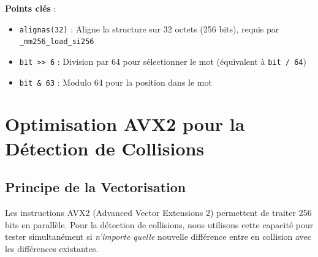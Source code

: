 \documentclass[12pt,a4paper,twoside]{report}
\begin{document}
\textbf{Points clés} :
\begin{itemize}
    \item \texttt{alignas(32)} : Aligne la structure sur 32 octets (256 bits), requis par \texttt{\_mm256\_load\_si256}
    \item \texttt{bit >> 6} : Division par 64 pour sélectionner le mot (équivalent à \texttt{bit / 64})
    \item \texttt{bit \& 63} : Modulo 64 pour la position dans le mot
\end{itemize}

\section{Optimisation AVX2 pour la Détection de Collisions}

\subsection{Principe de la Vectorisation}

Les instructions AVX2 (Advanced Vector Extensions 2) permettent de traiter 256 bits en parallèle. Pour la détection de collisions, nous utilisons cette capacité pour tester simultanément si \emph{n'importe quelle} nouvelle différence entre en collision avec les différences existantes.
\end{document}
